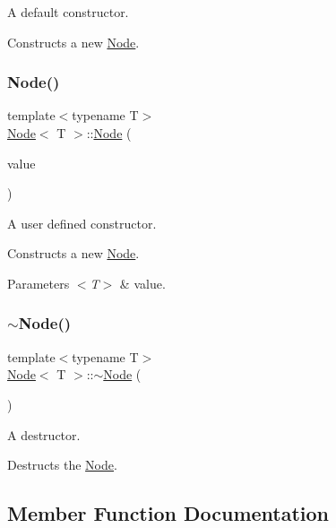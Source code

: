 A default constructor. 

Constructs a new \mbox{\hyperlink{class_node}{Node}}. \mbox{\label{class_node_aa72a44d0679a17d33d7a6f2b41790125}} 
\subsubsection{\texorpdfstring{Node()}{Node()}\hspace{0.1cm}{\footnotesize\ttfamily [2/2]}}
{\footnotesize\ttfamily template$<$typename T$>$ \\
\mbox{\hyperlink{class_node}{Node}}$<$ T $>$\+::\mbox{\hyperlink{class_node}{Node}} (\begin{DoxyParamCaption}\item[{T}]{value }\end{DoxyParamCaption})\hspace{0.3cm}{\ttfamily [inline]}}



A user defined constructor. 

Constructs a new \mbox{\hyperlink{class_node}{Node}}. 
\begin{DoxyParams}{Parameters}
{\em $<$\+T$>$} & value. \\
\hline
\end{DoxyParams}
\mbox{\label{class_node_ae923d0417581dd19784d55b901f0f7f0}} 
\subsubsection{\texorpdfstring{$\sim$\+Node()}{~Node()}}
{\footnotesize\ttfamily template$<$typename T$>$ \\
\mbox{\hyperlink{class_node}{Node}}$<$ T $>$\+::$\sim$\mbox{\hyperlink{class_node}{Node}} (\begin{DoxyParamCaption}{ }\end{DoxyParamCaption})\hspace{0.3cm}{\ttfamily [inline]}}



A destructor. 

Destructs the \mbox{\hyperlink{class_node}{Node}}. 

\subsection{Member Function Documentation}
\mbox{\label{class_node_aaf2b6c875d0972479da9a26fca47db54}} 
